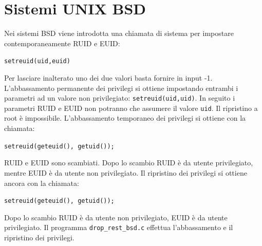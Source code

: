\section{Sistemi UNIX BSD}
Nei sistemi BSD viene introdotta una chiamata di sistema per impostare contemporaneamente RUID e EUID:
\begin{center}
    \texttt{setreuid(uid,euid)}
\end{center}
Per lasciare inalterato uno dei due valori basta fornire in input -1. L'abbassamento permanente dei privilegi si ottiene impostando entrambi i parametri ad un valore non privilegiato: \texttt{setreuid(uid,uid)}. In seguito i parametri RUID e EUID non potranno che assumere il valore \texttt{uid}. Il ripristino a root è impossibile. L'abbassamento temporaneo dei privilegi si ottiene con la chiamata:
\begin{center}
    \texttt{setreuid(geteuid(), getuid());}
\end{center}
RUID e EUID sono scambiati. Dopo lo scambio RUID è da utente privilegiato, mentre EUID è da utente non privilegiato. Il ripristino dei privilegi si ottiene ancora con la chiamata:
\begin{center}
    \texttt{setreuid(geteuid(), getuid());}
\end{center}
Dopo lo scambio RUID è da utente non privilegiato, EUID è da utente privilegiato. Il programma \texttt{drop\_rest\_bsd.c} effettua l'abbassamento e il ripristino dei privilegi.

